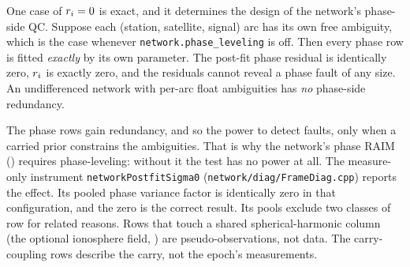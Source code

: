 \documentclass[main.tex]{subfiles}
\begin{document}
One case of $r_i = 0$ is exact, and it determines the design of the
network's phase-side QC.  Suppose each (station, satellite,
signal) arc has its own free ambiguity, which is the case whenever
\texttt{network.phase\_leveling} is off.  Then every phase row is fitted
\emph{exactly} by its own parameter.  The post-fit phase residual is
identically zero, $r_i$ is exactly zero, and the residuals cannot
reveal a phase fault of any size.  An undifferenced network with per-arc
float ambiguities has \emph{no} phase-side redundancy.

The phase rows gain redundancy, and so the power to detect faults, only
when a carried prior constrains the ambiguities.  That is why the
network's phase RAIM () requires
phase-leveling: without it the test has no power at all.  The
measure-only instrument \texttt{networkPostfitSigma0}
(\texttt{network/diag/FrameDiag.cpp}) reports the effect.  Its pooled phase
variance factor is identically zero in that configuration, and the zero
is the correct result.  Its pools exclude two classes of row for related
reasons.  Rows that touch a shared spherical-harmonic column (the optional
ionosphere field, ) are
pseudo-observations, not data.  The
carry-coupling rows describe the carry, not the epoch's measurements.
\end{document}
